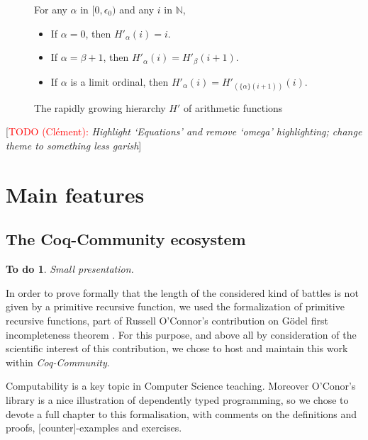 \documentclass{easychair}
\makeatletter
\newcommand{\inputsnippets}[1]
  {{\setlength{\itemsep}{1pt}\setlength{\parsep}{0pt}%
    \alectryon@copymacros\begin{io}
      \forcsvlist{\item\@inputsnippet}{#1}
    \end{io}}}
\let@old Save definition of 
\newcommand{\@inputsnippet}[1]
  {{\renewenvironment{alectryon}{}{}%
    @old{#1}}}
\newcommand{\canonseq}[2]{\mbox{$\{#1\}(#2)$}}
\newtheorem{todo}{To do}
\newcommand{\TODO}[2][]{[\textcolor{red}{TODO (#1):} \emph{#2}]}
\makeatother
\begin{document}
\begin{figure}[h]
 \noindent
 For any $\alpha$ in $[0,\epsilon_0)$ and any $i$ in $\mathbb{N}$,
   \begin{itemize}
\item If $\alpha=0$, then $H'_\alpha (i)= i$.
\item If $\alpha=\beta+1$, then 
$H'_\alpha(i)=H'_\beta(i+1)$.
\item If $\alpha$ is a limit ordinal, then 
$H'_\alpha(i) = H'_{(\canonseq{\alpha}{i+1})}(i)$.
\end{itemize}
\vspace{4pt}
\inputsnippets{HprimeDef}
\caption{The rapidly growing hierarchy $H'$ of arithmetic functions}
\label{fig:Hprime}
\end{figure}

\label{sect:not-pr}

\TODO[Clément]{Highlight `Equations' and remove `omega' highlighting; change theme to something less garish}

 
\section{Main features}




\subsection{The Coq-Community ecosystem}
\begin{todo}
Small presentation.
\end{todo}

In order to prove formally that the length of the considered
kind of battles is not given by a primitive recursive function, we used the formalization of primitive recursive functions, part
of Russell O'Connor's contribution on G\"{o}del first incompleteness theorem \cite{OConnor05, Goedel}.
For this purpose, and above all by consideration of the scientific interest of this contribution, we chose to host and maintain this work within \textit{Coq-Community}.

Computability is a key topic in Computer Science teaching. Moreover O'Conor's library is a nice illustration of dependently typed programming, so we chose to devote a full chapter to this formalisation, with comments on the definitions and proofs, [counter]-examples and exercises.
\end{document}
